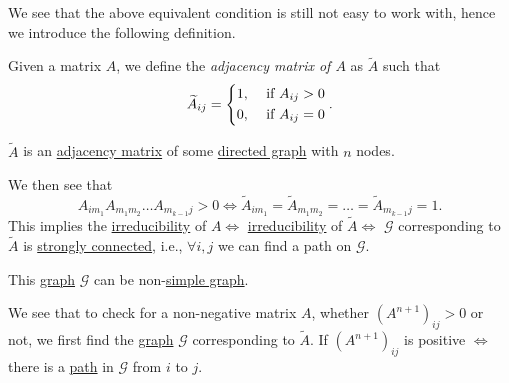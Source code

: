 We see that the above equivalent condition is still not easy to work with, hence we introduce the following definition.

\begin{definition}\label{def:adjacency-matrix-of-a-matrix}
	Given a matrix \(A\), we define the \emph{adjacency matrix of \(A\)} as \(\widetilde{A} \) such that
	\[
		\widetilde{A}_{ij} = \begin{dcases}
			1, & \text{ if }A_{ij}>0 \\
			0, & \text{ if }A_{ij}=0 \\
		\end{dcases}.
	\]
\end{definition}

\begin{note}
	\(\widetilde{A} \) is an \hyperref[def:adjacency-matrix]{adjacency matrix} of some \hyperref[def:directed-graph]{directed graph} with \(n\) nodes.
\end{note}

We then see that
\[
	A_{im_1} A_{m_1 m_2}\ldots A_{m_{k-1} j} > 0 \iff \widetilde{A}_{im_1} = \widetilde{A}_{m_1 m_2} = \ldots = \widetilde{A}_{m_{k-1}j} = 1.
\]
This implies the \hyperref[def:irreducible]{irreducibility} of \(A \iff\) \hyperref[def:irreducible]{irreducibility} of \(\widetilde{A}\iff\) \(\mathcal{G}\) corresponding to \(\widetilde{A}\) is \hyperref[def:strongly-connected]{strongly connected}, i.e., \(\forall  i, j\) we can find a path on \(\mathcal{G}\).
\begin{remark}
	This \hyperref[def:graph]{graph} \(\mathcal{G}\) can be non-\hyperref[def:simple-graph]{simple graph}.
\end{remark}

We see that to check for a non-negative matrix \(A\), whether \((A^{n+1})_{ij} > 0\) or not, we first find the \hyperref[def:graph]{graph} \(\mathcal{G} \) corresponding to \(\widetilde{A}\). If \((A^{n+1})_{ij}\) is positive \(\iff\) there is a \hyperref[def:path]{path} in \(\mathcal{G}\) from \(i\) to \(j\).